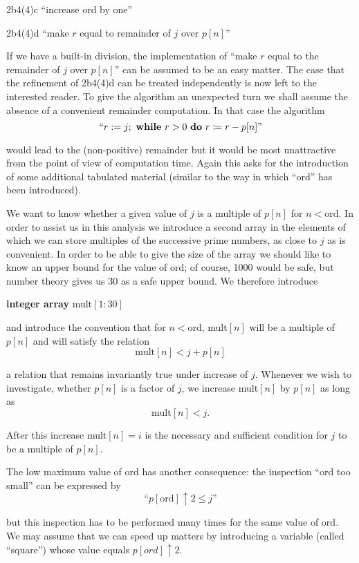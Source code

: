 \noindent
2b4(4)c\tabto{5em} ``increase ord by one''

\noindent
2b4(4)d\tabto{5em} ``make $r$ equal to remainder of $j$ over $p[n]$''

If we have a built-in division, the implementation of ``make $r$ equal to the remainder of $j$ over $p[n]$'' can be assumed to be an easy matter. The case that the refinement of 2b4(4)d can be treated independently is now left to the interested reader. To give the algorithm an unexpected turn we shall assume the absence of a convenient remainder computation. In that case the algorithm
$$
\text{``}r: = j;\text{ \textbf{while} } r > 0\text{ \textbf{do} } r \coloneq r - p[n]\text{''}
$$

\noindent
would lead to the (non-positive) remainder but it would be most unattractive from the point of view of computation time. Again this asks for the introduction of some additional tabulated material (similar to the way in which ``ord'' has been introduced).

We want to know whether a given value of $j$ is a multiple of $p[n]$ for $n < \text{ord}$. In order to assist us in this analysis we introduce a second array in the elements of which we can store multiples of the successive prime numbers, as close to $j$ as is convenient. In order to be able to give the size of the array we should like to know an upper bound for the value of ord; of course, 1000 would be safe, but number theory gives us 30 as a safe upper bound. We therefore introduce

\noindent
\textbf{integer array} mult$[1 : 30]$

\noindent
and introduce the convention that for $n < \text{ord}$, mult$[n]$ will be a multiple of $p[n]$ and will satisfy the relation
$$
\text{mult}[n] < j + p[n]
$$

\noindent
a relation that remains invariantly true under increase of $j$. Whenever we wish to investigate, whether $p[n]$ is a factor of $j$, we increase mult$[n]$ by $p[n]$ as long as
$$
\text{mult}[n] < j.
$$

\noindent
After this increase mult$[n] = i$ is the necessary and sufficient condition for $j$ to be a multiple of $p[n]$.

The low maximum value of ord has another consequence: the inspection ``ord too small'' can be expressed by
$$
\text{``}p[\text{ord}] \uparrow 2 \leqslant j\text{''}
$$

\noindent
but this inspection has to be performed many times for the same value of ord. We may assume that we can speed up matters by introducing a variable (called ``square'') whose value equals $p[ord] \uparrow 2$.

